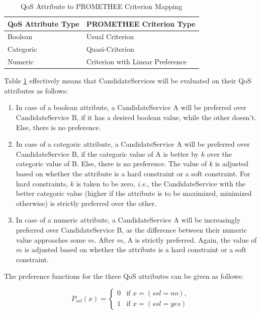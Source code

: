 \documentclass[10pt,journal,compsoc]{IEEEtran}
\begin{document}
\begin{table}
\centering
\begin{tabular}{ll}
\toprule
QoS Attribute Type & PROMETHEE Criterion Type \\
\midrule
Boolean & Usual Criterion \\
Categoric & Quasi-Criterion \\
Numeric & Criterion with Linear Preference \\
\bottomrule
\end{tabular}
\caption{QoS Attribute to PROMETHEE Criterion Mapping \label{tbl:qos_promethee_mapping}}
\end{table}

Table \ref{tbl:qos_promethee_mapping} effectively means that CandidateServices will be evaluated on their QoS attributes as follows:
	\begin{enumerate}
		\item In case of a boolean attribute, a CandidateService A will be preferred over CandidateService B, if it has a desired boolean value, while the other doesn't. Else, there is no preference.
		\item In case of a categoric attribute, a CandidateService A will be preferred over CandidateService B, if the categoric value of A is better by $k$ over the categoric value of B. Else, there is no preference. The value of $k$ is adjusted based on whether the attribute is a hard constraint or a soft constraint. For hard constraints, $k$ is taken to be zero, \textit{i.e.}, the CandidateService with the better categoric value (higher if the attribute is to be maximized, minimized otherwise) is strictly preferred over the other. 
		\item In case of a numeric attribute, a CandidateService A will be increasingly preferred over CandidateService B, as the difference between their numeric value approaches some $m$. After $m$, A is strictly preferred. Again, the value of $m$ is adjusted based on whether the attribute is a hard constraint or a soft constraint. 
	\end{enumerate}
	
	The preference functions for the three QoS attributes can be given as follows:
	
	\begin{equation}
		P_{ssl}(x) = \begin{cases} 0 &\mbox{if } x = (ssl=no),\\ 
							1 &\mbox{if } x = (ssl=yes) \end{cases}
			\label{pref_ssl}
	\end{equation}
\end{document}
